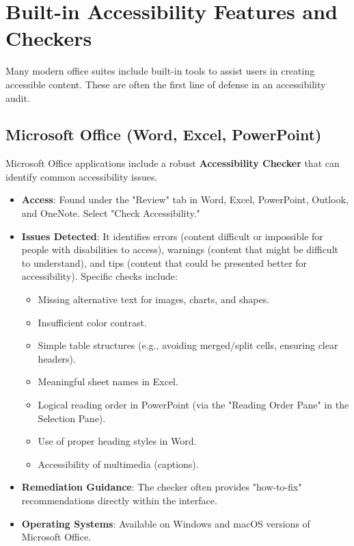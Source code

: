 \section{Built-in Accessibility Features and Checkers}
\label{sec:office-built-in-checkers}

Many modern office suites include built-in tools to assist users in creating accessible content. These are often the first line of defense in an accessibility audit.

\subsection{Microsoft Office (Word, Excel, PowerPoint)}
Microsoft Office applications include a robust \textbf{Accessibility Checker}\cite{MSAccessibilityChecker} that can identify common accessibility issues.
\begin{itemize}
    \item \textbf{Access}: Found under the "Review" tab in Word, Excel, PowerPoint, Outlook, and OneNote. Select "Check Accessibility."
    \item \textbf{Issues Detected}: It identifies errors (content difficult or impossible for people with disabilities to access), warnings (content that might be difficult to understand), and tips (content that could be presented better for accessibility). Specific checks include:
        \begin{itemize}
            \item Missing alternative text for images, charts, and shapes.
            \item Insufficient color contrast.
            \item Simple table structures (e.g., avoiding merged/split cells, ensuring clear headers).
            \item Meaningful sheet names in Excel.
            \item Logical reading order in PowerPoint (via the "Reading Order Pane" in the Selection Pane).
            \item Use of proper heading styles in Word.
            \item Accessibility of multimedia (captions).
        \end{itemize}
    \item \textbf{Remediation Guidance}: The checker often provides "how-to-fix" recommendations directly within the interface.
    \item \textbf{Operating Systems}: Available on Windows and macOS versions of Microsoft Office.
\end{itemize}

